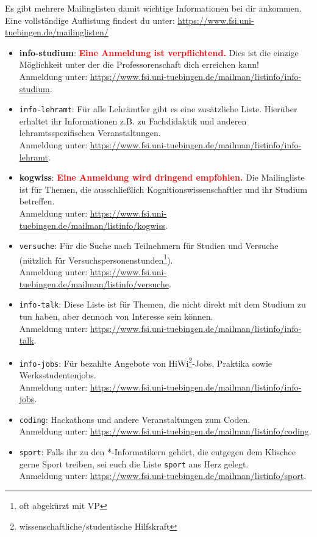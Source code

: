 Es gibt mehrere Mailinglisten damit wichtige Informationen bei dir ankommen.\\
Eine vollständige Auflistung findest du unter: \url{https://www.fsi.uni-tuebingen.de/mailinglisten/}
\begin{itemize}
\item \textbf{info-studium}: \textcolor{red}{\textbf{Eine Anmeldung ist verpflichtend.}} Dies ist die einzige Möglichkeit unter der die Professorenschaft dich erreichen kann! \\
Anmeldung unter: \url{https://www.fsi.uni-tuebingen.de/mailman/listinfo/info-studium}.
\iflehramt
\item \texttt{info-lehramt}: Für alle Lehrämtler gibt es eine zusätzliche Liste. Hierüber erhaltet ihr Informationen z.B. zu Fachdidaktik und anderen lehramtsspezifischen Veranstaltungen.\\
Anmeldung unter: \url{https://www.fsi.uni-tuebingen.de/mailman/listinfo/info-lehramt}.
\fi
\ifkogwiss 
\item \textbf{kogwiss}: \textcolor{red}{\textbf{Eine Anmeldung wird dringend empfohlen.}} Die Mailingliste ist für Themen, die ausschließlich Kognitionswissenschaftler und ihr Studium betreffen. \\
Anmeldung unter: \url{https://www.fsi.uni-tuebingen.de/mailman/listinfo/kogwiss}.

\item \texttt{versuche}: Für die Suche nach Teilnehmern für Studien und Versuche (nützlich für Versuchspersonenstunden\footnote{oft abgekürzt mit VP}).\\
Anmeldung unter: \url{https://www.fsi.uni-tuebingen.de/mailman/listinfo/versuche}. 
\fi
\item \texttt{info-talk}: Diese Liste ist für Themen, die nicht direkt mit dem Studium zu tun haben, aber dennoch von Interesse sein können.\\
Anmeldung unter: \url{https://www.fsi.uni-tuebingen.de/mailman/listinfo/info-talk}.
\item \texttt{info-jobs}: Für bezahlte Angebote von HiWi\footnote{wissenschaftliche/studentische Hilfskraft}-Jobs, Praktika sowie  Werksstudentenjobs.\\
Anmeldung unter: \url{https://www.fsi.uni-tuebingen.de/mailman/listinfo/info-jobs}.
\item \texttt{coding}: Hackathons und andere Veranstaltungen zum Coden.\\
Anmeldung unter: \url{https://www.fsi.uni-tuebingen.de/mailman/listinfo/coding}.
\item \texttt{sport}: Falls ihr zu den *-Informatikern gehört, die entgegen dem Klischee gerne Sport treiben, sei euch die Liste \texttt{sport} ans Herz gelegt.\\
Anmeldung unter: \url{https://www.fsi.uni-tuebingen.de/mailman/listinfo/sport}. 
\end{itemize}

